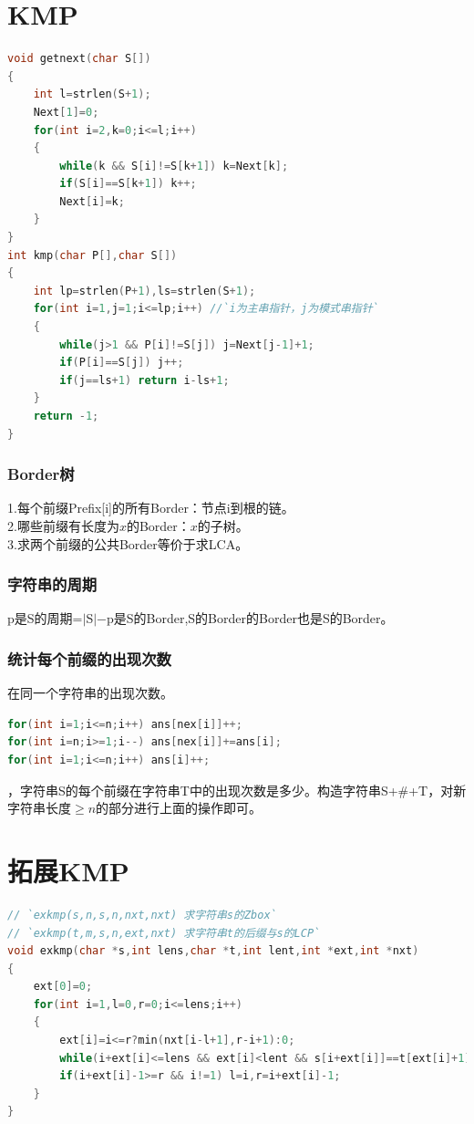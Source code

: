 \documentclass[a4paper]{book}
\begin{document}
\section{KMP}
\begin{lstlisting}[language=c++,escapeinside=``]
void getnext(char S[])
{
    int l=strlen(S+1);
    Next[1]=0;
    for(int i=2,k=0;i<=l;i++)
    {
        while(k && S[i]!=S[k+1]) k=Next[k];
        if(S[i]==S[k+1]) k++;
        Next[i]=k;
    }
}
int kmp(char P[],char S[])
{
    int lp=strlen(P+1),ls=strlen(S+1);
    for(int i=1,j=1;i<=lp;i++) //`i为主串指针，j为模式串指针`
    {
        while(j>1 && P[i]!=S[j]) j=Next[j-1]+1;
        if(P[i]==S[j]) j++;
        if(j==ls+1) return i-ls+1;
    }
    return -1;
}
\end{lstlisting}
\subsubsection{Border树}
\indent1.每个前缀Prefix[i]的所有Border：节点i到根的链。\\
\indent2.哪些前缀有长度为$x$的Border：$x$的子树。\\
\indent3.求两个前缀的公共Border等价于求LCA。\\
\subsubsection{字符串的周期}
\indent p是S的周期=$|$S$|-$p是S的Border,S的Border的Border也是S的Border。\\
\subsubsection{统计每个前缀的出现次数}
在同一个字符串的出现次数。
\begin{lstlisting}[language=c++,escapeinside=``]
for(int i=1;i<=n;i++) ans[nex[i]]++;
for(int i=n;i>=1;i--) ans[nex[i]]+=ans[i];
for(int i=1;i<=n;i++) ans[i]++;
\end{lstlisting}
，字符串S的每个前缀在字符串T中的出现次数是多少。构造字符串S+\#+T，对新字符串长度$\ge n$的部分进行上面的操作即可。\\
\section{拓展KMP}
\begin{lstlisting}[language=c++,escapeinside=``]
// `exkmp(s,n,s,n,nxt,nxt) 求字符串s的Zbox`
// `exkmp(t,m,s,n,ext,nxt) 求字符串t的后缀与s的LCP`
void exkmp(char *s,int lens,char *t,int lent,int *ext,int *nxt)
{
    ext[0]=0;
    for(int i=1,l=0,r=0;i<=lens;i++)
    {
        ext[i]=i<=r?min(nxt[i-l+1],r-i+1):0;
        while(i+ext[i]<=lens && ext[i]<lent && s[i+ext[i]]==t[ext[i]+1]) ext[i]++;
        if(i+ext[i]-1>=r && i!=1) l=i,r=i+ext[i]-1;
    }
}
\end{lstlisting}
\end{document}
